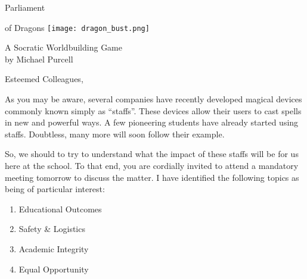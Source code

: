\documentclass[a6paper, 11pt, parskip=half, DIV=15]{scrartcl}
\begin{document}
\begin{titlepage}
\enlargethispage{3.0\baselineskip}
\setmainfont[Scale=1.65]{DarkCrystal-Regular}
\Huge
\begin{center}
\vspace*{-0.5\baselineskip}
Parliament

of Dragons
%
\vfill
\texttt{[image: dragon\_bust.png]}

\vfill
\huge
\setmainfont{Tex Gyre Chorus}
A Socratic Worldbuilding Game\\
\setmainfont{Tex Gyre Chorus}
by Michael Purcell
\end{center}
\end{titlepage}
\thispagestyle{empty}
\enlargethispage{3.5\baselineskip}
\setmainfont{Tex Gyre Chorus}
\large
\noindent Esteemed Colleagues,

As you may be aware, several companies have recently developed magical devices commonly known simply as ``staffs''.
These devices allow their users to cast spells in new and powerful ways. 
A few pioneering students have already started using staffs.
Doubtless, many more will soon follow their example.

So, we should to try to understand what the impact of these staffs will be for us here at the school.
To that end, you are cordially invited to attend a mandatory meeting tomorrow to discuss the matter.
I have identified the following topics as being of particular interest:
\begin{enumerate}[nosep]
	\item Educational Outcomes
	\item Safety \& Logistics
	\item Academic Integrity
	\item Equal Opportunity
\end{enumerate}   
\end{document}
